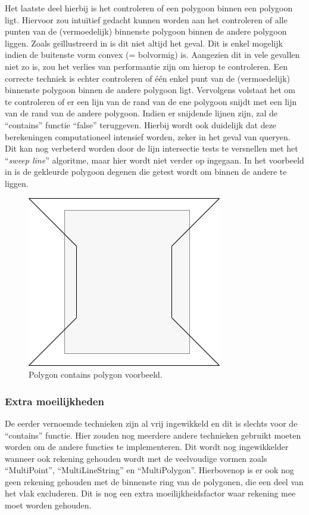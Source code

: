 Het laatste deel hierbij is het controleren of een polygoon binnen een polygoon ligt. Hiervoor zou intuïtief gedacht kunnen worden aan het controleren of alle punten van de (vermoedelijk) binnenste polygoon binnen de andere polygoon liggen. Zoals geïllustreerd in  is dit niet altijd het geval. Dit is enkel mogelijk indien de buitenste vorm convex (= bolvormig) is. Aangezien dit in vele gevallen niet zo is, zou het verlies van performantie zijn om hierop te controleren. Een correcte techniek is echter controleren of één enkel punt van de (vermoedelijk) binnenste polygoon binnen de andere polygoon ligt. Vervolgens volstaat het om te controleren of er een lijn van de rand van de ene polygoon snijdt met een lijn van de rand van de andere polygoon. Indien er snijdende lijnen zijn, zal de ``contains'' functie ``false'' teruggeven. Hierbij wordt ook duidelijk dat deze berekeningen computationeel intensief worden, zeker in het geval van queryen. Dit kan nog verbeterd worden door de lijn intersectie tests te versnellen met het ``\textit{sweep line}'' algoritme, maar hier wordt niet verder op ingegaan. In het voorbeeld in  is de gekleurde polygoon degenen die getest wordt om binnen de andere te liggen.

\begin{figure}
    \centering
    \includegraphics[width=0.3\linewidth]{images/polygon_contains_polygon.png}
    \caption{Polygon contains polygon voorbeeld.}
    \label{fig:polygon_contains_polygon}
\end{figure}


\subsubsection{Extra moeilijkheden}
De eerder vernoemde technieken zijn al vrij ingewikkeld en dit is slechts voor de ``contains'' functie. Hier zouden nog meerdere andere technieken gebruikt moeten worden om de andere functies te implementeren. Dit wordt nog ingewikkelder wanneer ook rekening gehouden wordt met de veelvoudige vormen zoals ``MultiPoint'', ``MultiLineString'' en ``MultiPolygon''. Hierbovenop is er ook nog geen rekening gehouden met de binnenste ring van de polygonen, die een deel van het vlak excluderen. Dit is nog een extra moeilijkheidsfactor waar rekening mee moet worden gehouden.  

